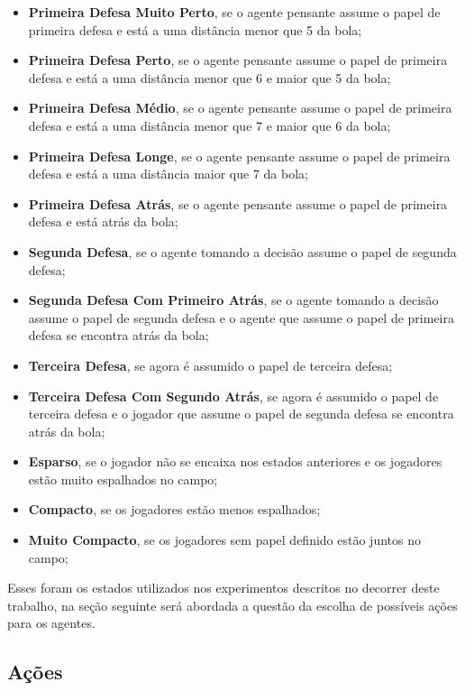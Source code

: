 \begin{itemize}
    \item \textbf{Primeira Defesa Muito Perto}, se o agente pensante assume o
    papel de primeira defesa e está a uma distância menor que 5 da bola;
    \item \textbf{Primeira Defesa Perto}, se o agente pensante assume o papel de
    primeira defesa e está a uma distância menor que 6 e maior que 5 da bola;
    \item \textbf{Primeira Defesa Médio}, se o agente pensante assume o papel de
    primeira defesa e está a uma distância menor que 7 e maior que 6 da bola;
    \item \textbf{Primeira Defesa Longe}, se o agente pensante assume o papel de
    primeira defesa e está a uma distância maior que 7 da bola;
    \item \textbf{Primeira Defesa Atrás}, se o agente pensante assume o papel de
    primeira defesa e está atrás da bola;
    \item  \textbf{Segunda Defesa}, se o agente tomando a decisão assume o papel
    de segunda defesa;
    \item  \textbf{Segunda Defesa Com Primeiro Atrás}, se o agente tomando a
    decisão assume o papel de segunda defesa e o agente que assume o papel de
    primeira defesa se encontra atrás da bola;
    \item \textbf{Terceira Defesa}, se agora é assumido o papel de terceira
    defesa;
    \item \textbf{Terceira Defesa Com Segundo Atrás}, se agora é assumido o
    papel de terceira defesa e o jogador que assume o papel de segunda defesa se
    encontra atrás da bola;
    \item \textbf{Esparso}, se o jogador não se encaixa nos estados anteriores e
    os jogadores estão muito espalhados no campo;
    \item \textbf{Compacto}, se os jogadores estão menos espalhados;
    \item \textbf{Muito Compacto}, se os jogadores sem papel definido estão
    juntos no campo;
\end{itemize}

Esses foram os estados utilizados nos experimentos descritos no decorrer deste
trabalho, na seção seguinte será abordada a questão da escolha de possíveis
ações para os agentes.

\subsection{Ações}\label{actions}

